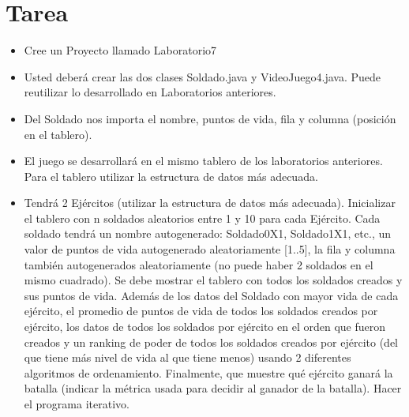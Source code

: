 \documentclass{article}
\begin{document}

	\section{Tarea}
	\begin{itemize}		
        \item Cree un Proyecto llamado Laboratorio7
        \item Usted deberá crear las dos clases Soldado.java y VideoJuego4.java. Puede reutilizar lo
        desarrollado en Laboratorios anteriores.
        \item Del Soldado nos importa el nombre, puntos de vida, fila y columna (posición en el tablero).
        \item El juego se desarrollará en el mismo tablero de los laboratorios anteriores. Para el tablero
        utilizar la estructura de datos más adecuada.
        \item Tendrá 2 Ejércitos (utilizar la estructura de datos más adecuada). Inicializar el tablero con n
        soldados aleatorios entre 1 y 10 para cada Ejército. Cada soldado tendrá un nombre
        autogenerado: Soldado0X1, Soldado1X1, etc., un valor de puntos de vida autogenerado
        aleatoriamente [1..5], la fila y columna también autogenerados aleatoriamente (no puede
        haber 2 soldados en el mismo cuadrado). Se debe mostrar el tablero con todos los soldados
        creados y sus puntos de vida. Además de los datos del Soldado con mayor vida de cada ejército, el
        promedio de puntos de vida de todos los soldados creados por ejército, los datos de todos los
        soldados por ejército en el orden que fueron creados y un ranking de poder de todos los
        soldados creados por ejército (del que tiene más nivel de vida al que tiene menos) usando 2 diferentes algoritmos de ordenamiento. Finalmente, que muestre qué ejército ganará la batalla (indicar la métrica usada para decidir al ganador de la batalla). Hacer el programa iterativo.

	\end{itemize}
		
\end{document}
